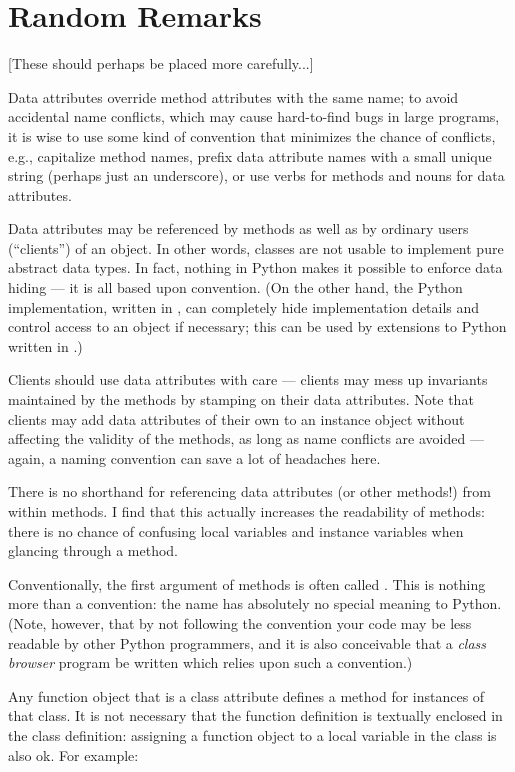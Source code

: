 \documentclass{manual}
\begin{document}
\section{Random Remarks}
\label{remarks}

[These should perhaps be placed more carefully...]


Data attributes override method attributes with the same name; to
avoid accidental name conflicts, which may cause hard-to-find bugs in
large programs, it is wise to use some kind of convention that
minimizes the chance of conflicts, e.g., capitalize method names,
prefix data attribute names with a small unique string (perhaps just
an underscore), or use verbs for methods and nouns for data attributes.


Data attributes may be referenced by methods as well as by ordinary
users (``clients'') of an object.  In other words, classes are not
usable to implement pure abstract data types.  In fact, nothing in
Python makes it possible to enforce data hiding --- it is all based
upon convention.  (On the other hand, the Python implementation,
written in \C{}, can completely hide implementation details and control
access to an object if necessary; this can be used by extensions to
Python written in \C{}.)


Clients should use data attributes with care --- clients may mess up
invariants maintained by the methods by stamping on their data
attributes.  Note that clients may add data attributes of their own to
an instance object without affecting the validity of the methods, as
long as name conflicts are avoided --- again, a naming convention can
save a lot of headaches here.


There is no shorthand for referencing data attributes (or other
methods!) from within methods.  I find that this actually increases
the readability of methods: there is no chance of confusing local
variables and instance variables when glancing through a method.


Conventionally, the first argument of methods is often called
.  This is nothing more than a convention: the name
 has absolutely no special meaning to Python.  (Note,
however, that by not following the convention your code may be less
readable by other Python programmers, and it is also conceivable that
a \emph{class browser} program be written which relies upon such a
convention.)


Any function object that is a class attribute defines a method for
instances of that class.  It is not necessary that the function
definition is textually enclosed in the class definition: assigning a
function object to a local variable in the class is also ok.  For
example:
\end{document}
